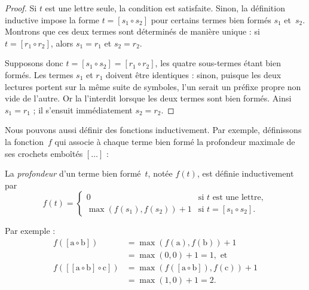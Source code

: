 \documentclass[../../../include/open-logic-section]{subfiles}
\begin{document}
\begin{proof}
  Si $t$ est une
  lettre seule,
  la condition est
  satisfaite.
  Sinon, la définition
  inductive impose
  la forme
  $t=[s_1\circ s_2]$
  pour certains
  termes bien formés
  $s_1$ et~$s_2$.
  Montrons que
  ces deux termes
  sont déterminés
  de manière unique :
  si
  $t=[r_1\circ r_2]$,
  alors $s_1=r_1$
  et $s_2=r_2$.

  Supposons donc
  $t=[s_1\circ s_2]
  =[r_1\circ r_2]$,
  les quatre
  sous-termes étant
  bien formés.
  Les termes $s_1$
  et $r_1$ doivent
  être identiques :
  sinon, puisque
  les deux lectures
  portent sur la
  même suite de
  symboles, l'un
  serait un préfixe
  propre non vide
  de l'autre.
  Or la
  l'interdit lorsque
  les deux termes sont
  bien formés.
  Ainsi $s_1=r_1$ ;
  il s'ensuit
  immédiatement
  $s_2=r_2$.
\end{proof}

Nous pouvons aussi
définir des fonctions
inductivement.
Par exemple,
définissons la
fonction~$f$
qui associe à
chaque terme bien
formé la profondeur
maximale de ses
crochets emboîtés
$[\dots]$ :
\begin{defn}
  La \emph{profondeur}
  d'un terme
  bien formé~$t$,
  notée $f(t)$,
  est définie
  inductivement par
  \[
    f(t)=
    \begin{cases}
      0
        & \text{si $t$ est une lettre},\\
      \max(f(s_1),f(s_2))+1
        & \text{si $t=[s_1\circ s_2]$.}
    \end{cases}
  \]
\end{defn}

Par exemple :
\begin{align*}
  f([\mathrm{a}\circ\mathrm{b}])
    &=\max(f(\mathrm{a}),f(\mathrm{b}))+1\\
    &=\max(0,0)+1=1,
      \text{ et}\\
  f([[\mathrm{a}\circ\mathrm{b}]
      \circ\mathrm{c}])
    &=\max(f([\mathrm{a}\circ\mathrm{b}]),
           f(\mathrm{c}))+1\\
    &=\max(1,0)+1=2.
\end{align*}
\end{document}
